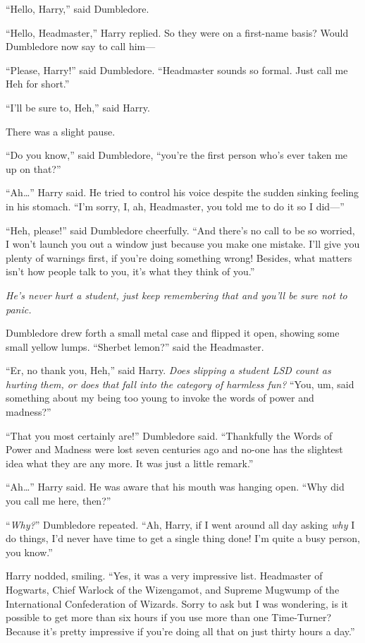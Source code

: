 “Hello, Harry,” said Dumbledore.

“Hello, Headmaster,” Harry replied. So they were on a first-name basis? Would Dumbledore now say to call him—

“Please, Harry!” said Dumbledore.
“Headmaster sounds so formal. Just call me Heh for short.”

“I’ll be sure to, Heh,” said Harry.

There was a slight pause.

“Do you know,” said Dumbledore, “you’re the first person who’s ever taken me up on that?”

“Ah…” Harry said. He tried to control his voice despite the sudden sinking feeling in his stomach.
“I’m sorry, I, ah, Headmaster, you told me to do it so I did—”

“Heh, please!” said Dumbledore cheerfully.
“And there’s no call to be so worried, I won’t launch you out a window just because you make one mistake. I’ll give you plenty of warnings first, if you’re doing something wrong! Besides, what matters isn’t how people talk to you, it’s what they think of you.”

\emph{He’s never hurt a student, just keep remembering that and you’ll be sure not to panic.}

Dumbledore drew forth a small metal case and flipped it open, showing some small yellow lumps.
“Sherbet lemon?” said the Headmaster.

“Er, no thank you, Heh,” said Harry. \emph{Does slipping a student LSD count as hurting them, or does that fall into the category of harmless fun?}
“You, um, said something about my being too young to invoke the words of power and madness?”

“That you most certainly are!” Dumbledore said.
“Thankfully the Words of Power and Madness were lost seven centuries ago and no-one has the slightest idea what they are any more. It was just a little remark.”

“Ah…” Harry said. He was aware that his mouth was hanging open.
“Why did you call me here, then?”

“\emph{Why?}” Dumbledore repeated.
“Ah, Harry, if I went around all day asking \emph{why} I do things, I’d never have time to get a single thing done! I’m quite a busy person, you know.”

Harry nodded, smiling.
“Yes, it was a very impressive list. Headmaster of Hogwarts, Chief Warlock of the Wizengamot, and Supreme Mugwump of the International Confederation of Wizards. Sorry to ask but I was wondering, is it possible to get more than six hours if you use more than one Time-Turner? Because it’s pretty impressive if you’re doing all that on just thirty hours a day.”

